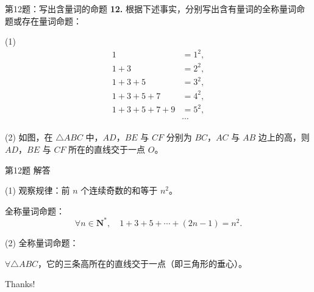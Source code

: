 \documentclass[10pt,aspectratio=169,serif]{beamer}
\begin{document}
\begin{frame}[t]{第12题：写出含量词的命题}
\textbf{12.} 根据下述事实，分别写出含有量词的全称量词命题或存在量词命题：

\vspace{0.5em}
(1) 
\[
\begin{aligned}
1 &= 1^2, \\
1 + 3 &= 2^2, \\
1 + 3 + 5 &= 3^2, \\
1 + 3 + 5 + 7 &= 4^2, \\
1 + 3 + 5 + 7 + 9 &= 5^2, \\
&\cdots
\end{aligned}
\]

\vspace{0.5em}
(2) 如图，在 $\triangle ABC$ 中，$AD$，$BE$ 与 $CF$ 分别为 $BC$，$AC$ 与 $AB$ 边上的高，则 $AD$，$BE$ 与 $CF$ 所在的直线交于一点 $O$。
\end{frame}

\begin{frame}[t]{第12题 解答}
\begin{tcolorbox}[colback=orange!10,colframe=orange,title=\textbf{解}]
(1) 观察规律：前 $n$ 个连续奇数的和等于 $n^2$。

\vspace{0.3em}
全称量词命题：
\[
\forall n \in \mathbf{N}^*,\quad 1 + 3 + 5 + \cdots + (2n-1) = n^2.
\]

\vspace{0.8em}
(2) 全称量词命题：

\vspace{0.3em}
$\forall \triangle ABC$，它的三条高所在的直线交于一点（即三角形的垂心）。
\end{tcolorbox}
\end{frame}

\begin{frame}[c]
  \begin{center}
    {\Huge\calligra Thanks!}
  \end{center}
\end{frame}
\end{document}
